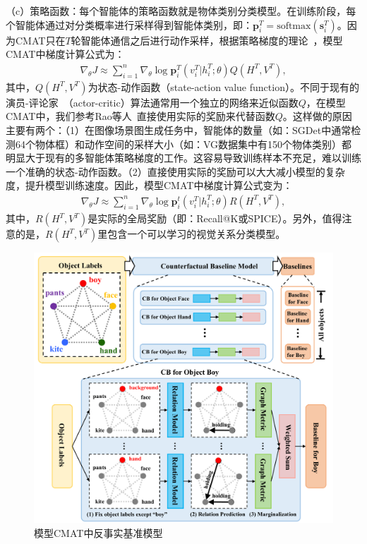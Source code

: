 （c）策略函数：每个智能体的策略函数就是物体类别分类模型。在训练阶段，每个智能体通过对分类概率进行采样得到智能体类别，即：$\bm{p}^T_i = \text{softmax}(\bm{s}^T_i)$。因为CMAT只在$T$轮智能体通信之后进行动作采样，根据策略梯度的理论~\cite{sutton2000policy}，模型CMAT中梯度计算公式为：
\begin{align}
\nabla_{\theta} J \approx \sum^n_{i=1} \nabla_{\theta} \log \bm{p}^T_i (v^T_i|h^T_i; \theta)Q(H^T, V^T),
\end{align}
其中，$Q(H^T, V^T)$为状态-动作函数（state-action value function）。不同于现有的演员-评论家~\cite{bahdanau2017actor,lowe2017multi,konda2000actor}（actor-critic）算法通常用一个独立的网络来近似函数$Q$，在模型CMAT中，我们参考Rao等人~\cite{rao2018learning}直接使用实际的奖励来代替函数$Q$。这样做的原因主要有两个：（1）在图像场景图生成任务中，智能体的数量（如：SGDet中通常检测64个物体框）和动作空间的采样大小（如：VG数据集中有150个物体类别）都明显大于现有的多智能体策略梯度的工作。这容易导致训练样本不充足，难以训练一个准确的状态-动作函数。（2）直接使用实际的奖励可以大大减小模型的复杂度，提升模型训练速度。因此，模型CMAT中梯度计算公式变为：
\begin{align} \label{ch4:eq:eq_7}
\nabla_{\theta} J \approx \sum^n_{i=1} \nabla_{\theta} \log \bm{p}^t_i (v^T_i|h^T_i; \theta) R(H^T, V^T),
\end{align}
其中，$R(H^T, V^T)$是实际的全局奖励（即：Recall@K或SPICE）。另外，值得注意的是，$R(H^T, V^T)$里包含一个可以学习的视觉关系分类模型。

\begin{figure}[t]
    \centering
        \includegraphics[width=0.95\linewidth]{chapter4/res/baseline.pdf}
    \caption{模型CMAT中反事实基准模型}
    \label{ch4:fig:baseline}
\end{figure}


